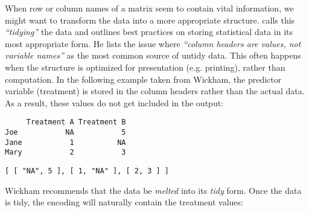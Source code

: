 When row or column names of a matrix seem to contain vital information, we might want to transform the data into a more appropriate structure. \cite{tidydata} calls this \emph{``tidying''} the data and outlines best practices on storing statistical data in its most appropriate form. He lists the issue where \emph{``column headers are values, not variable names''} as the most common source of untidy data. This often happens when the structure is optimized for presentation (e.g. printing), rather than computation. In the following example taken from Wickham, the predictor variable (treatment) is stored in the column headers rather than the actual data. As a result, these values do not get included in the \JSON output:

\begin{knitrout}\mycodesize
{}\color{fgcolor}\begin{kframe}
\begin{alltt}
 \hlkwb{<-} \hlstd{(}\hlstd{(}\hlstd{,} \hlstd{,} \hlstd{,} \hlstd{,} \hlstd{,} \hlstd{),}  \hlstd{=} \hlstd{)}
 \hlkwb{<-} \hlstd{(}\hlstd{,} \hlstd{,} \hlstd{)}
 \hlkwb{<-} \hlstd{(}\hlstd{,} \hlstd{)}
\end{alltt}
\begin{verbatim}
     Treatment A Treatment B
Joe           NA           5
Jane           1          NA
Mary           2           3
\end{verbatim}
\begin{alltt}
\hlstd{(}
\end{alltt}
\begin{verbatim}
[ [ "NA", 5 ], [ 1, "NA" ], [ 2, 3 ] ]
\end{verbatim}
\end{kframe}
\end{knitrout}


Wickham recommends that the data be \emph{melted} into its \emph{tidy} form. Once the data is tidy, the \JSON encoding will naturally contain the treatment values:

